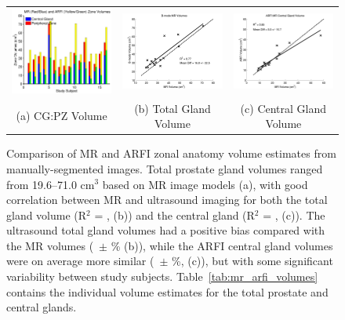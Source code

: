 \begin{figure}
\centering
\begin{tabular}{ccc}
\includegraphics[width=0.3\linewidth]{figs/mr_arfi_volumes} &
\includegraphics[width=0.3\linewidth]{figs/mr_arfi_total_linreg} &
\includegraphics[width=0.3\linewidth]{figs/mr_arfi_central_linreg} \\
(a) CG:PZ Volume & (b) Total Gland Volume & (c) Central Gland Volume \\
\end{tabular}
\caption{Comparison of MR and ARFI zonal anatomy volume estimates from
    manually-segmented images.  Total prostate gland volumes ranged from
    19.6--71.0 cm$^3$ based on MR image models (a), with good correlation
    between MR and ultrasound imaging for both the total gland volume (R$^2$ =
    \MRarfiVolTotalRsq, (b)) and the central gland (R$^2$ =
    \MRarfiVolCentralRsq, (c)).  The ultrasound total gland volumes had a positive
    bias compared with the MR volumes (\MRarfiVolTotalMeanDiff~$\pm$
    \MRarfiVolTotalStdDiff\% (b)), while the ARFI central gland volumes were on
    average more similar (\MRarfiVolCentralMeanDiff~$\pm$
    \MRarfiVolCentralStdDiff\%, (c)), but with some significant variability
    between study subjects.  Table~\ref{tab:mr_arfi_volumes} contains the
    individual volume estimates for the total prostate and central glands.}
\label{fig:mr_arfi_volumes} 
\end{figure}
